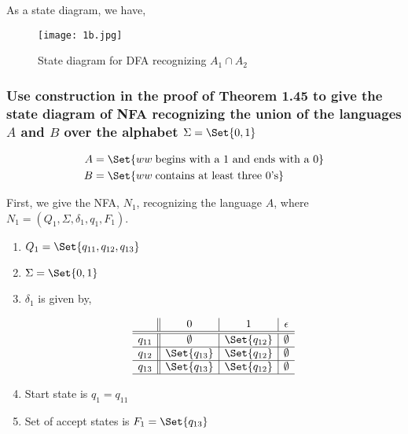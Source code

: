 \documentclass{article}
\providecommand\given{} %
\begin{document}
As a state diagram, we have,


\begin{figure}[H]
    \centering
    \texttt{[image: 1b.jpg]}
    \caption{State diagram for DFA recognizing $A_1 \cap A_2$}
    \label{fig:my_label}
\end{figure}


\subsubsection{Use construction in the proof of Theorem 1.45 to give the state diagram of NFA recognizing the union of the languages $A$ and $B$ over the alphabet $\Sigma = \Set{0,1}$}

\begin{align*}
    A &= \Set{w \given w \; \text{begins with a 1 and ends with a 0}} \\
    B &= \Set{w \given w \; \text{contains at least three 0's}} \\
\end{align*}

First, we give the NFA, $N_1$, recognizing the language $A$, where $N_1 = (Q_1, \Sigma, \delta_1, q_1, F_1)$.

\begin{enumerate}
    \item $Q_1 = \Set{q_{11}, q_{12}, q_{13}}$
    \item $\Sigma = \Set{0,1}$
    \item $\delta_1$ is given by,
    
\begin{figure}[H]
\centering

\[
\begin{array}{c||c|c|c}
         & 0 & 1 & \epsilon \\ \hline \hline 
        q_{11} & \emptyset & \Set{q_{12}} & \emptyset \\ \hline 
        q_{12} & \Set{q_{13}} & \Set{q_{12}} & \emptyset \\ \hline 
        q_{13} & \Set{q_{13}} & \Set{q_{12}} & \emptyset \\ \hline 
\end{array}
\]

\caption{}
\label{fig:mylabel}
\end{figure}

    
    \item Start state is $q_1 = q_{11}$
    \item Set of accept states is $F_1 = \Set{q_{13}}$
\end{enumerate}
\end{document}
